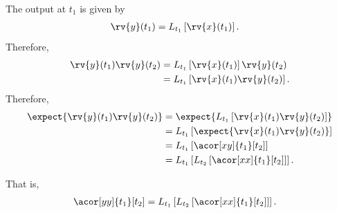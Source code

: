 The output at $t_{1}$ is given by
\begin{align}
    \rv{y}(t_{1}) &= L_{t_{1}}\left[ \rv{x}(t_{1}) \right].
\end{align}
Therefore, 
\begin{align}
    \rv{y}(t_{1})\rv{y}(t_{2}) &= L_{t_{1}}\left[ \rv{x}(t_{1}) \right]\rv{y}(t_{2})\\
    &= L_{t_{1}}\left[ \rv{x}(t_{1})\rv{y}(t_{2}) \right].
\end{align}
Therefore,
\begin{align}
    \expect{ \rv{y}(t_{1}) \rv{y}(t_{2})} 
    &= \expect{ L_{t_{1}}\left[ \rv{x}(t_{1}) \rv{y}(t_{2}) \right]} \\
    &= L_{t_{1}}\left[ \expect{ \rv{x}(t_{1})\rv{y}(t_{2})} \right]\\
    &= L_{t_{1}}\left[ \acor[xy]{t_{1}}[t_{2}] \right]\\
    &= L_{t_{1}}\left[ L_{t_{2}}\left[ \acor[xx]{t_{1}}[t_{2}] \right] \right].
\end{align}
\begin{blueBox}
    That is,
    \begin{align}
        \acor[yy]{t_{1}}[t_{2}] &= L_{t_{1}}\left[ L_{t_{2}}\left[ \acor[xx]{t_{1}}[t_{2}] \right] \right].
    \end{align}
\end{blueBox}

